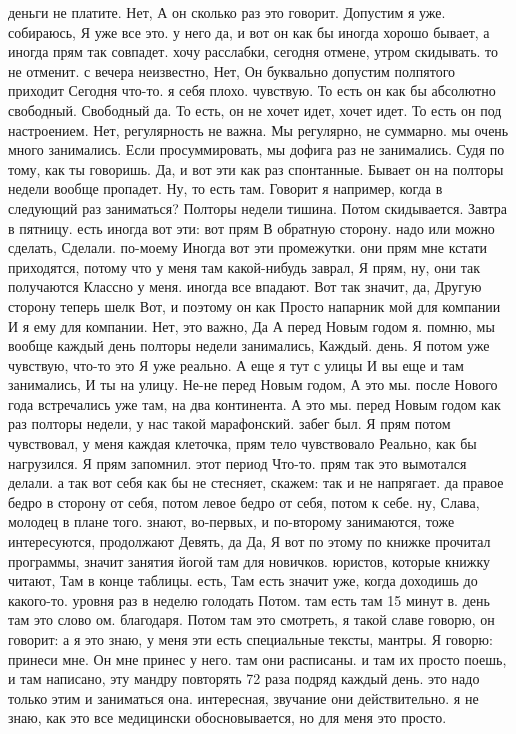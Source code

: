 деньги не платите.
Нет, А он сколько раз это говорит. Допустим я уже.
собираюсь, Я уже все это.
у него да, и вот он как бы иногда хорошо бывает, а иногда прям так совпадет. хочу расслабки, сегодня отмене, утром скидывать.
то не отменит. с вечера неизвестно, Нет, Он буквально допустим полпятого приходит Сегодня что-то.
я себя плохо.
чувствую.
То есть он как бы абсолютно свободный.
Свободный да.
То есть, он не хочет идет, хочет идет.
То есть он под настроением.
Нет, регулярность не важна.
Мы регулярно, не суммарно. мы очень много занимались.
Если просуммировать, мы дофига раз не занимались.
Судя по тому, как ты говоришь.
Да, и вот эти как раз спонтанные.
Бывает он на полторы недели вообще пропадет.
Ну, то есть там.
Говорит я например, когда в следующий раз заниматься?
Полторы недели тишина.
Потом скидывается.
Завтра в пятницу.
есть иногда вот эти:
вот прям В обратную сторону. надо или можно сделать, Сделали.
по-моему Иногда вот эти промежутки.
они прям мне кстати приходятся, потому что у меня там какой-нибудь заврал, Я прям, ну, они так получаются Классно у меня.
иногда все впадают. Вот так значит, да, Другую сторону теперь шелк Вот, и поэтому он как Просто напарник мой для компании И я ему для компании.
Нет, это важно, Да А перед Новым годом я.
помню, мы вообще каждый день полторы недели занимались, Каждый.
день. Я потом уже чувствую, что-то это Я уже реально. А еще я тут с улицы И вы еще и там занимались, И ты на улицу.
Не-не перед Новым годом, А это мы. после Нового года встречались уже там, на два континента. А это мы.
перед Новым годом как раз полторы недели, у нас такой марафонский.
забег был. Я прям потом чувствовал, у меня каждая клеточка, прям тело чувствовало Реально, как бы нагрузился. Я прям запомнил.
этот период Что-то.
прям так это вымотался делали.
а так вот себя как бы не стесняет, скажем:
так и не напрягает. да правое бедро в сторону от себя, потом левое бедро от себя, потом к себе. ну, Слава, молодец в плане того.
знают, во-первых, и по-второму занимаются, тоже интересуются, продолжают Девять, да Да, Я вот по этому по книжке прочитал программы, значит занятия йогой там для новичков.
юристов, которые книжку читают, Там в конце таблицы.
есть, Там есть значит уже, когда доходишь до какого-то.
уровня раз в неделю голодать Потом.
там есть там 15 минут в.
день там это слово ом.
благодаря.
Потом там это смотреть, я такой славе говорю, он говорит: а я это знаю, у меня эти есть специальные тексты, мантры.
Я говорю: принеси мне.
Он мне принес у него. там они расписаны.
и там их просто поешь, и там написано, эту мандру повторять 72 раза подряд каждый день. это надо только этим и заниматься она. интересная, звучание они действительно. я не знаю, как это все медицински обосновывается, но для меня это просто.
